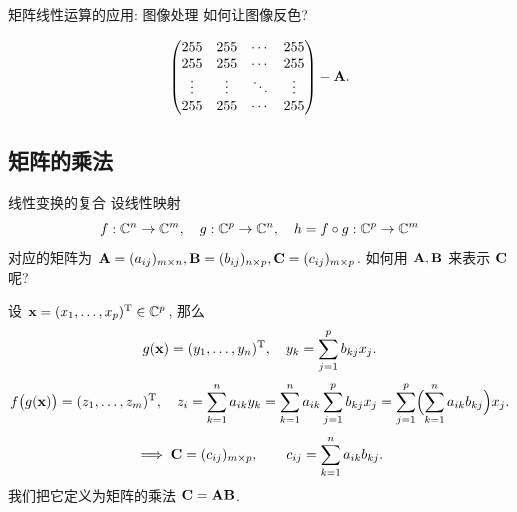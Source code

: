 \begin{frame}{矩阵线性运算的应用: 图像处理}
	\onslide<+->
	如何让图像反色?
	\begin{center}
	\end{center}
	
	\onslide<+->
	\[\begin{pmatrix}
		255&255&\cdots&255\\
		255&255&\cdots&255\\
		\vdots&\vdots&\ddots&\vdots\\
		255&255&\cdots&255
	\end{pmatrix}-{\mathbf{A}}.\]
\end{frame}

\subsection{矩阵的乘法}


\begin{frame}{线性变换的复合}
	\onslide<+->
	设线性映射
	\[f:{\mathbb{C}}^n\to{\mathbb{C}}^m,\quad
	g:{\mathbb{C}}^p\to {\mathbb{C}}^n,\quad 
	h=f\circ g:{\mathbb{C}}^p\to{\mathbb{C}}^m\]
	对应的矩阵为 ${\mathbf{A}}=(a_{ij})_{m\times n}, {\mathbf{B}}=(b_{ij})_{n\times p},{\mathbf{C}}=(c_{ij})_{m\times p}$.
	\onslide<+->
	如何用 ${\mathbf{A}},{\mathbf{B}}$ 来表示 ${\mathbf{C}}$ 呢?

	\onslide<+->
	设 ${\mathbf{x}}=(x_1,\dots,x_p)^{\mathrm{T}}\in {\mathbb{C}}^p$, 那么
	\[g({\mathbf{x}})=(y_1,\dots,y_n)^{\mathrm{T}}, \quad
		y_k=\sum_{j=1}^p b_{kj} x_j.\]
	\onslide<+->
	\[f\bigl(g({\mathbf{x}})\bigr)=(z_1,\dots,z_m)^{\mathrm{T}}, \quad
	z_i=\sum_{k=1}^n a_{ik} y_k=\sum_{k=1}^n a_{ik} \sum_{j=1}^p b_{kj} x_j=\sum_{j=1}^p\Bigl(\sum_{k=1}^n a_{ik}b_{kj}\Bigr)x_j.\]
	\onslide<+->
	\[\implies{\mathbf{C}}=(c_{ij})_{m\times p},\qquad c_{ij}=\sum_{k=1}^n a_{ik}b_{kj}.\]
	\onslide<+->
	我们把它定义为矩阵的乘法 ${\mathbf{C}}={\mathbf{A}}{\mathbf{B}}$.
\end{frame}


